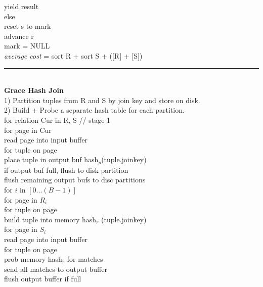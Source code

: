 \documentclass[10pt,landscape]{article}
\newcommand{\ruler}{\\\rule{\columnwidth}{0.25pt}\\}
\begin{document}
\begin{multicols*}{3}
\-\hspace{0.5cm} yield result\\
else\\
\-\hspace{0.5cm} reset s to mark\\
\-\hspace{0.5cm} advance r\\
\-\hspace{0.5cm} mark = NULL\\
\textit{average cost} = sort R + sort S + ($[$R$]$ + $[$S$]$)
\ruler
\textbf{Grace Hash Join}\\
1) Partition tuples from R and S by join key and store on disk.\\
2) Build + Probe a separate hash table for each partition.\\
for relation Cur in {R, S} // stage 1\\ 
\-\hspace{0.5cm} for page in Cur\\
\-\hspace{1.0cm} read page into input buffer\\
\-\hspace{1.0cm} for tuple on page\\
\-\hspace{1.5cm} place tuple in output buf hash$_p$(tuple.joinkey)\\
\-\hspace{1.5cm} if output buf full, flush to disk partition\\
\-\hspace{0.5cm} flush remaining output bufs to disc partitions\\
for $i$ in $[0...(B-1)]$\\
\-\hspace{0.5cm} for page in $R_i$\\
\-\hspace{1.0cm} for tuple on page\\
\-\hspace{1.5cm} build tuple into memory hash$_r$ (tuple.joinkey)\\
\-\hspace{0.5cm} for page in $S_i$\\
\-\hspace{1.0cm} read page into input buffer\\
\-\hspace{1.0cm} for tuple on page\\
\-\hspace{1.5cm} prob memory hash$_r$ for matches\\
\-\hspace{1.5cm} send all matches to output buffer\\
\-\hspace{1.5cm} flush output buffer if full\\


\end{multicols*}
\end{document}
